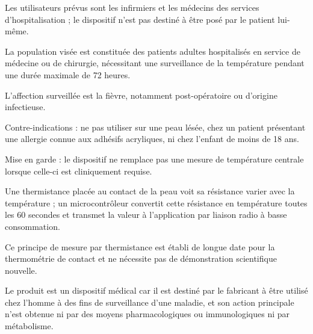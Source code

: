 \documentclass[11pt,a4paper]{article}
\begin{document}
{\small Les utilisateurs prévus sont les infirmiers et les médecins des services d'hospitalisation ; le dispositif n'est pas destiné à être posé par le patient lui-même.}\par

\par{}\par

{\small La population visée est constituée des patients adultes hospitalisés en service de médecine ou de chirurgie, nécessitant une surveillance de la température pendant une durée maximale de 72 heures.}\par

{\small L'affection surveillée est la fièvre, notamment post-opératoire ou d'origine infectieuse.}\par

{\small Contre-indications : ne pas utiliser sur une peau lésée, chez un patient présentant une allergie connue aux adhésifs acryliques, ni chez l'enfant de moins de 18 ans.}\par

{\small Mise en garde : le dispositif ne remplace pas une mesure de température centrale lorsque celle-ci est cliniquement requise.}\par

\par{}\par

{\small Une thermistance placée au contact de la peau voit sa résistance varier avec la température ; un microcontrôleur convertit cette résistance en température toutes les 60 secondes et transmet la valeur à l'application par liaison radio à basse consommation.}\par

{\small Ce principe de mesure par thermistance est établi de longue date pour la thermométrie de contact et ne nécessite pas de démonstration scientifique nouvelle.}\par

\par{}\par

{\small Le produit est un dispositif médical car il est destiné par le fabricant à être utilisé chez l'homme à des fins de surveillance d'une maladie, et son action principale n'est obtenue ni par des moyens pharmacologiques ou immunologiques ni par métabolisme.}\par
\end{document}
